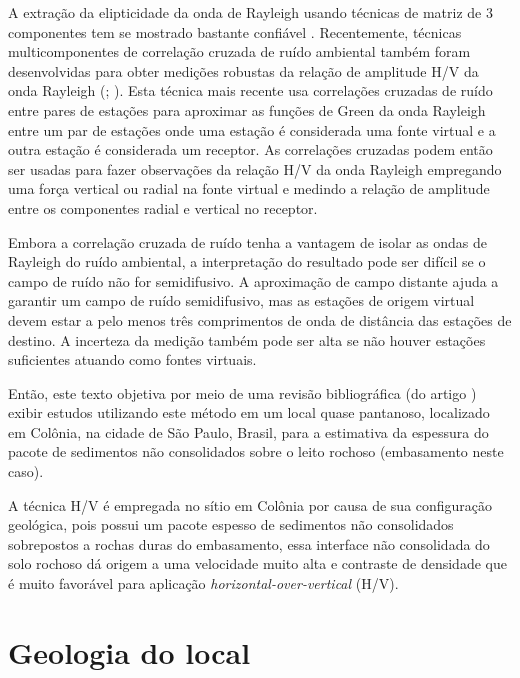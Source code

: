 \documentclass[smallextended]{svjour3}       %
\begin{document}
A extração da elipticidade da onda de Rayleigh usando técnicas de matriz de 3 componentes tem se mostrado bastante confiável \citep{poggi2010estimating}. Recentemente, técnicas multicomponentes de correlação cruzada de ruído ambiental também foram desenvolvidas para obter medições robustas da relação de amplitude H/V da onda Rayleigh (\citealp{lin2014upper}; \citealp{lin20143}). Esta técnica mais recente usa correlações cruzadas de ruído entre pares de estações para aproximar as funções de Green da onda Rayleigh entre um par de estações onde uma estação é considerada uma fonte virtual e a outra estação é considerada um receptor. As correlações cruzadas podem então ser usadas para fazer observações da relação H/V da onda Rayleigh empregando uma força vertical ou radial na fonte virtual e medindo a relação de amplitude entre os componentes radial e vertical no receptor.

Embora a correlação cruzada de ruído tenha a vantagem de isolar as ondas de Rayleigh do ruído ambiental, a interpretação do resultado pode ser difícil se o campo de ruído não for semidifusivo. 
A aproximação de campo distante ajuda a garantir um campo de ruído semidifusivo, mas as estações de origem virtual devem estar a pelo menos três comprimentos de onda de distância das estações de destino. A incerteza da medição também pode ser alta se não houver estações suficientes atuando como fontes virtuais.

Então, este texto objetiva por meio de uma revisão bibliográfica (do artigo \citealp{ullah2016thickness}) exibir estudos utilizando este método em um local quase pantanoso, localizado em Colônia, na cidade de São Paulo, Brasil, para a estimativa da espessura do pacote de sedimentos não consolidados sobre o leito rochoso (embasamento neste caso). 

A técnica H/V é empregada no sítio em Colônia por causa de sua configuração geológica, pois possui um pacote espesso de sedimentos não consolidados sobrepostos a rochas duras do embasamento, essa interface não consolidada do solo rochoso dá origem a uma velocidade muito alta e contraste de densidade que é muito favorável para aplicação \textit{horizontal-over-vertical} (H/V).


\section{Geologia do local}
\end{document}
